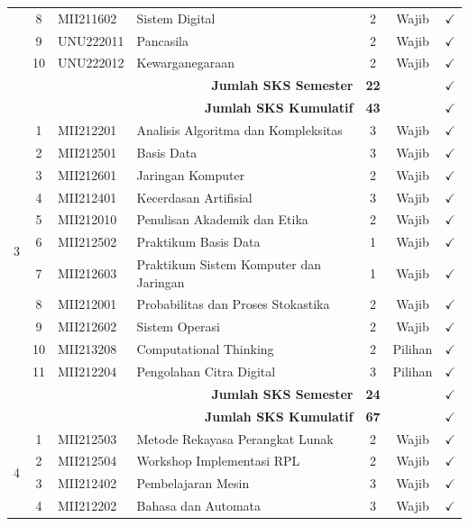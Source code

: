 \documentclass[a4paper,12pt]{article}
\begin{document}
\begin{longtable}{|c|c|l|p{5.5cm}|c|c|c|}
    & 8 & MII211602 & Sistem Digital & 2 & Wajib & $\checkmark$ \\
    & 9 & UNU222011 & Pancasila & 2 & Wajib & $\checkmark$ \\
    & 10 & UNU222012 & Kewarganegaraan & 2 & Wajib & $\checkmark$ \\
    \hline
    \multicolumn{4}{|r|}{\textbf{Jumlah SKS Semester}} & \textbf{22} & & $\checkmark$ \\
    \multicolumn{4}{|r|}{\textbf{Jumlah SKS Kumulatif}} & \textbf{43} & & $\checkmark$ \\
    \hline
    \multirow{11}{*}{3}
    & 1 & MII212201 & Analisis Algoritma dan Kompleksitas & 3 & Wajib & $\checkmark$ \\
    & 2 & MII212501 & Basis Data & 3 & Wajib & $\checkmark$ \\
    & 3 & MII212601 & Jaringan Komputer & 2 & Wajib & $\checkmark$ \\
    & 4 & MII212401 & Kecerdasan Artifisial & 3 & Wajib & $\checkmark$ \\
    & 5 & MII212010 & Penulisan Akademik dan Etika & 2 & Wajib & $\checkmark$ \\
    & 6 & MII212502 & Praktikum Basis Data & 1 & Wajib & $\checkmark$ \\
    & 7 & MII212603 & Praktikum Sistem Komputer dan Jaringan & 1 & Wajib & $\checkmark$ \\
    & 8 & MII212001 & Probabilitas dan Proses Stokastika & 2 & Wajib & $\checkmark$ \\
    & 9 & MII212602 & Sistem Operasi & 2 & Wajib & $\checkmark$ \\
    & 10 & MII213208 & Computational Thinking & 2 & Pilihan & $\checkmark$ \\
    & 11 & MII212204 & Pengolahan Citra Digital & 3 & Pilihan & $\checkmark$ \\
    \hline
    \multicolumn{4}{|r|}{\textbf{Jumlah SKS Semester}} & \textbf{24} & & $\checkmark$ \\
    \multicolumn{4}{|r|}{\textbf{Jumlah SKS Kumulatif}} & \textbf{67} & & $\checkmark$ \\
    \hline
    \multirow{9}{*}{4}
    & 1 & MII212503 & Metode Rekayasa Perangkat Lunak & 2 & Wajib & $\checkmark$ \\
    & 2 & MII212504 & Workshop Implementasi RPL & 2 & Wajib & $\checkmark$ \\
    & 3 & MII212402 & Pembelajaran Mesin & 3 & Wajib & $\checkmark$ \\
    & 4 & MII212202 & Bahasa dan Automata & 3 & Wajib & $\checkmark$ \\

\end{longtable}
\end{document}
